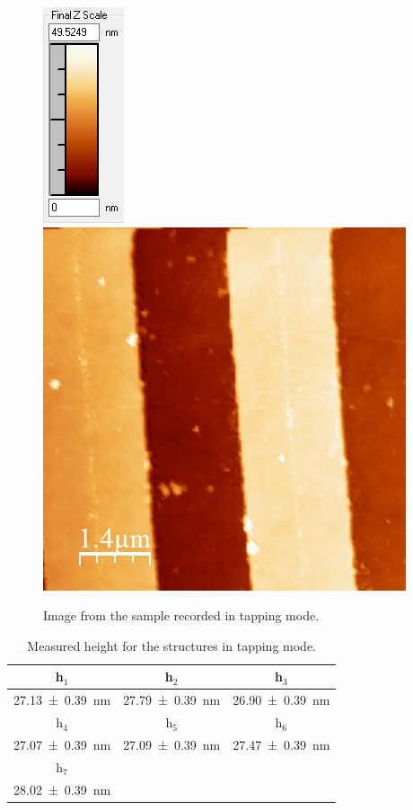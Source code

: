 \documentclass[%
 reprint,
amsmath,amssymb,
pra,
]{revtex4-1}
\begin{document}
\begin{figure}
\centering
\includegraphics[scale=0.7]{Bilder/Tapping_Mode/Rohdaten/try3_scalebar.PNG}
\includegraphics[scale=0.5]{Bilder/Tapping_Mode/Rohdaten/try3.JPG}
\caption{Image from the sample recorded in tapping mode.}
\label{fig:Tapping_raw_data}
\end{figure}

\begin{table}[h]
\centering
\begin{tabular}{|c|c|c|}
\hline 
h$_1$ & h$_2$ & h$_3$ \\ 
\hline 
\SI{27.13 \pm 0.39}{nm} & \SI{27.79 \pm 0.39}{nm} & \SI{26.90 \pm 0.39}{nm}  \\ 
\hline 
h$_4$ & h$_5$ & h$_6$ \\ 
\hline 
\SI{27.07 \pm 0.39}{nm} & \SI{27.09 \pm 0.39}{nm} & \SI{27.47 \pm 0.39}{nm}  \\ 
\hline 
 h$_7$ & & \\ 
\hline 
\SI{28.02 \pm 0.39}{nm} & &  \\ 
\hline 
\end{tabular} 
\caption{Measured height for the structures in tapping mode.}
\label{tab:Tapping_height}
\end{table}
\end{document}
